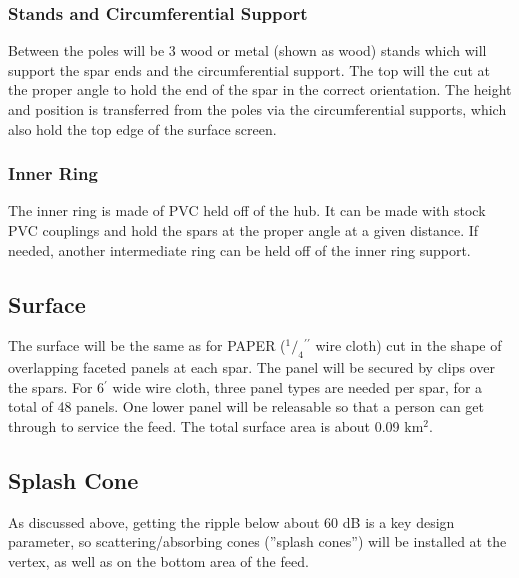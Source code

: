 \documentclass[11pt]{article}
\newcommand{\inch}{$^{\prime\prime}$}
\newcommand{\foot}{$^{\prime}$}
\begin{document}
\subsubsection{Stands and Circumferential Support}
Between the poles will be 3 wood or metal (shown as wood) stands which will support the spar ends and the circumferential support.  The top will the cut at the proper angle to hold the end of the spar in the correct orientation.  The height and position is transferred from the poles via the circumferential supports, which also hold the top edge of the surface screen.

\subsubsection{Inner Ring}
The inner ring is made of PVC held off of the hub.  It can be made with stock PVC couplings and hold the spars at the proper angle at a given distance.  If needed, another intermediate ring can be held off of the inner ring support.

\subsection{Surface}
The surface will be the same as for PAPER ($^1/_4$\inch{} wire cloth) cut in the shape of overlapping faceted panels at each spar.  The panel will be secured by clips over the spars.  For 6\foot{} wide wire cloth, three panel types are needed per spar, for a total of 48 panels.  One lower panel will be releasable so that a person can get through to service the feed.   The total surface area is about 0.09 km$^2$.

\subsection{Splash Cone}
As discussed above, getting the ripple below about 60 dB is a key design parameter, so scattering/absorbing cones (''splash cones'') will be installed at the vertex, as well as on the bottom area of the feed.
\end{document}
